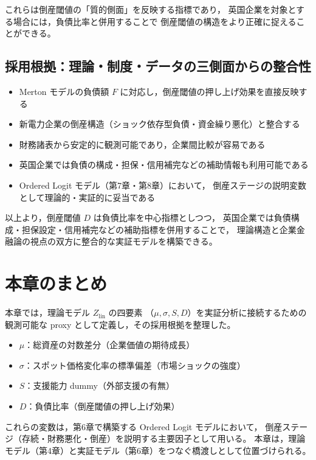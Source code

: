 これらは倒産閾値の「質的側面」を反映する指標であり，
英国企業を対象とする場合には，負債比率と併用することで
倒産閾値の構造をより正確に捉えることができる。

\subsection{採用根拠：理論・制度・データの三側面からの整合性}

\begin{itemize}
    \item Merton モデルの負債額 $F$ に対応し，倒産閾値の押し上げ効果を直接反映する
    \item 新電力企業の倒産構造（ショック依存型負債・資金繰り悪化）と整合する
    \item 財務諸表から安定的に観測可能であり，企業間比較が容易である
    \item 英国企業では負債の構成・担保・信用補完などの補助情報も利用可能である
    \item Ordered Logit モデル（第7章・第8章）において，
          倒産ステージの説明変数として理論的・実証的に妥当である
\end{itemize}

以上より，倒産閾値 $D$ は負債比率を中心指標としつつ，
英国企業では負債構成・担保設定・信用補完などの補助指標を併用することで，
理論構造と企業金融論の視点の双方に整合的な実証モデルを構築できる。

\section{本章のまとめ}

本章では，理論モデル $Z_{\text{lin}}$ の四要素
（$\mu, \sigma, S, D$）を実証分析に接続するための
観測可能な proxy として定義し，その採用根拠を整理した。

\begin{itemize}
    \item $\mu$：総資産の対数差分（企業価値の期待成長）
    \item $\sigma$：スポット価格変化率の標準偏差（市場ショックの強度）
    \item $S$：支援能力 dummy（外部支援の有無）
    \item $D$：負債比率（倒産閾値の押し上げ効果）
\end{itemize}

これらの変数は，第6章で構築する Ordered Logit モデルにおいて，
倒産ステージ（存続・財務悪化・倒産）を説明する主要因子として用いる。
本章は，理論モデル（第4章）と実証モデル（第6章）をつなぐ橋渡しとして位置づけられる。
